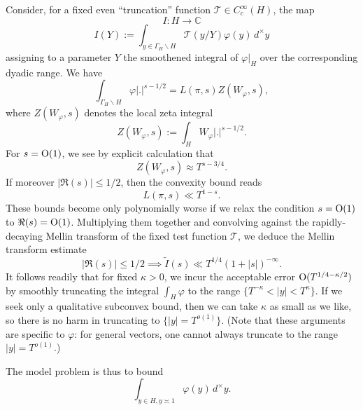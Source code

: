 \documentclass[reqno]{amsart} 
\numberwithin{equation}{section}
\begin{document}
Consider, for a fixed even ``truncation'' function $\mathcal{T} \in C_c^\infty(H)$, the map
\begin{equation*}
  I : H \rightarrow \mathbb{C} 
\end{equation*}
\begin{equation*}
  I(Y) := \int _{y \in \Gamma_{H} \backslash H}  \mathcal{T}(y/Y) \varphi(y) \, d^\times y
\end{equation*}
assigning to a parameter $Y$ the smoothened integral of $\varphi|_H$ over the corresponding dyadic range.  We have
\begin{equation*}
  \int _{\Gamma_{H} \backslash H} \varphi |.|^{s-1/2} = L(\pi,s) Z(W_\varphi,s),
\end{equation*}
where $Z(W_\varphi,s)$ denotes the local zeta integral
\begin{equation*}
  Z(W_\varphi,s) := \int _{H} W_\varphi |.|^{s-1/2}.
\end{equation*}
For $s = \operatorname{O}(1)$, we see by explicit calculation that
\begin{equation*}
  Z(W_\varphi,s) \approx T^{s-3/4}.
\end{equation*}
If moreover $|\Re(s)| \leq 1/2$, then the convexity bound reads
\begin{equation*}
  L(\pi,s) \ll T^{1 - s}.
\end{equation*}
These bounds become only polynomially worse if we relax the condition $s = \operatorname{O}(1)$ to $\Re(s) = \operatorname{O}(1)$.  Multiplying them together and convolving against the rapidly-decaying Mellin transform of the fixed test function $\mathcal{T}$, we deduce the Mellin transform estimate
\begin{equation*}
|\Re(s)| \leq 1/2 \implies \tilde{I}(s) \ll T^{1/4} (1 + |s|)^{-\infty}.
\end{equation*}
It follows readily that for fixed $\kappa > 0$, we incur the acceptable error $\operatorname{O}(T^{1/4 -\kappa/2})$ by smoothly truncating the integral $\int_H \varphi$ to the range $\{T^{-\kappa} < |y| < T^{\kappa}\}$.  If we seek only a qualitative subconvex bound, then we can take $\kappa$ as small as we like, so there is no harm in truncating to $\{ |y| = T^{o(1)} \}$.  (Note that these arguments are specific to $\varphi$: for general vectors, one cannot always truncate to the range $|y| = T^{o(1)}$.)


The model problem is thus to bound
\begin{equation}\label{eq:int-_y-in}
  \int _{y \in H, y \asymp 1} \varphi(y) \, d^\times y.
\end{equation}
\end{document}
